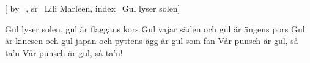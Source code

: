 

[ 		%
	by={},					%
	sr={Lili Marleen},					%
	index={Gul lyser solen}]						%
	

\beginverse*						%
Gul lyser solen, gul är flaggans kors
Gul vajar säden och gul är ängens pors
Gul är kinesen och gul japan
och pyttens ägg är gul som fan
Vår punsch är gul, så ta'n
Vår punsch är gul, så ta'n!
\endverse							%

\endsong							%